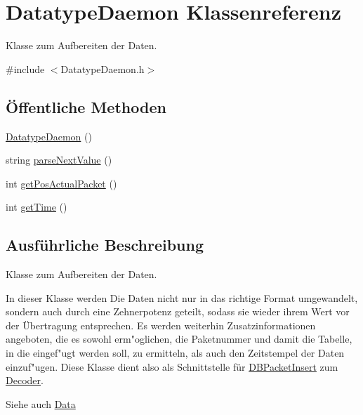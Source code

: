 \hypertarget{classDatatypeDaemon}{\section{Datatype\-Daemon Klassenreferenz}
\label{classDatatypeDaemon}
}


Klasse zum Aufbereiten der Daten.  




{\ttfamily \#include $<$Datatype\-Daemon.\-h$>$}

\subsection*{Öffentliche Methoden}
\begin{DoxyCompactItemize}
\item 
\hyperlink{classDatatypeDaemon_ad7a47d928c863d8ba26d840a8c96913f}{Datatype\-Daemon} ()
\item 
string \hyperlink{classDatatypeDaemon_a4b664832a3dcb05ad6f7c039573d8327}{parse\-Next\-Value} ()
\item 
int \hyperlink{classDatatypeDaemon_adfee8d7c9d970d0c3b5c867465f0a092}{get\-Pos\-Actual\-Packet} ()
\item 
int \hyperlink{classDatatypeDaemon_a3ba1b224d6d7287ca57d43d9b2452720}{get\-Time} ()
\end{DoxyCompactItemize}


\subsection{Ausführliche Beschreibung}
Klasse zum Aufbereiten der Daten. 

In dieser Klasse werden Die Daten nicht nur in das richtige Format umgewandelt, sondern auch durch eine Zehnerpotenz geteilt, sodass sie wieder ihrem Wert vor der \"Ubertragung entsprechen. Es werden weiterhin Zusatzinformationen angeboten, die es sowohl erm"oglichen, die Paketnummer und damit die Tabelle, in die eingef"ugt werden soll, zu ermitteln, als auch den Zeitstempel der Daten einzuf"ugen. Diese Klasse dient also als Schnittstelle f\"ur \hyperlink{classDBPacketInsert}{D\-B\-Packet\-Insert} zum \hyperlink{classDecoder}{Decoder}.

\begin{DoxySeeAlso}{Siehe auch}
\hyperlink{classData}{Data} 
\end{DoxySeeAlso}


